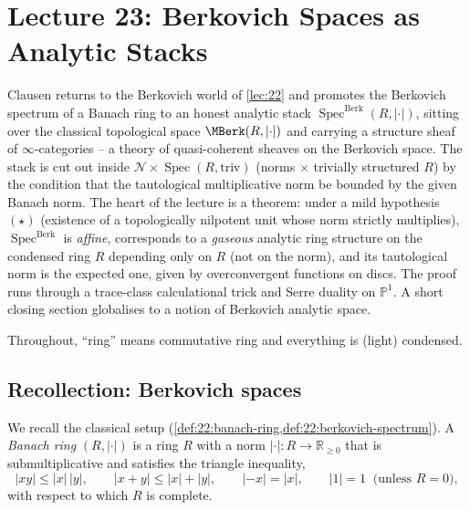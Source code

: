 \section{Lecture 23: Berkovich Spaces as Analytic Stacks}
\label{lec:23}

Clausen returns to the Berkovich
world of \cref{lec:22} and promotes the Berkovich spectrum of a Banach ring to
an honest analytic stack $\operatorname{Spec}^{\mathrm{Berk}}(R,\lvert\cdot\rvert)$,
sitting over the classical topological space $\MBerk(R,\lvert\cdot\rvert)$ and
carrying a structure sheaf of $\infty$-categories -- a theory of
quasi-coherent sheaves on the Berkovich space. The stack is cut out inside
$\mathcal N\times\operatorname{Spec}(R,\mathrm{triv})$ (norms $\times$ trivially
structured $R$) by the condition that the tautological multiplicative norm be
bounded by the given Banach norm. The heart of the lecture is a theorem: under
a mild hypothesis $(\star)$ (existence of a topologically nilpotent unit whose
norm strictly multiplies), $\operatorname{Spec}^{\mathrm{Berk}}$ is
\emph{affine}, corresponds to a \emph{gaseous} analytic ring structure on the
condensed ring $R$ depending only on $R$ (not on the norm), and its tautological
norm is the expected one, given by overconvergent functions on discs. The proof
runs through a trace-class calculational trick and Serre duality on
$\mathbb P^1$. A short closing section globalises to a notion of Berkovich
analytic space.

Throughout, ``ring'' means commutative ring and everything is (light)
condensed.

\subsection{Recollection: Berkovich spaces}
\label{subsec:23:recollection}

We recall the classical setup (\cref{def:22:banach-ring,def:22:berkovich-spectrum}).
A \emph{Banach ring} $(R,\lvert\cdot\rvert)$ is a ring $R$ with a norm
$\lvert\cdot\rvert\colon R\to\mathbb R_{\ge0}$ that is submultiplicative and
satisfies the triangle inequality,
\begin{equation*}
\lvert xy\rvert\le\lvert x\rvert\,\lvert y\rvert,\qquad
\lvert x+y\rvert\le\lvert x\rvert+\lvert y\rvert,\qquad
\lvert-x\rvert=\lvert x\rvert,\qquad
\lvert1\rvert=1\ \text{ (unless } R=0\text{)},
\end{equation*}
with respect to which $R$ is complete.


